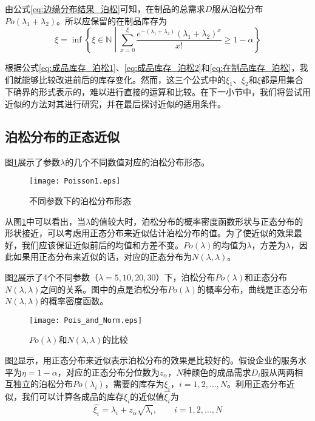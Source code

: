 由公式\ref{eq:边缘分布结果_泊松}可知，在制品的总需求$D$服从泊松分布$Po(\lambda_1+\lambda_2)$。所以应保留的在制品库存为
\begin{equation}
\xi = \inf\left\{\xi\in\mathbb{N}\middle|\sum_{x=0}^{\xi}\frac{e^{-(\lambda_1+\lambda_2)}(\lambda_1+\lambda_2)^x}{x!}\geq 1-\alpha\right\}
\label{eq:在制品库存_泊松}
\end{equation}

根据公式\ref{eq:成品库存_泊松1}、\ref{eq:成品库存_泊松2}和\ref{eq:在制品库存_泊松}，我们就能够比较改进前后的库存变化。然而，这三个公式中的$\xi_1$、$\xi_2$和$\xi$都是用集合下确界的形式表示的，难以进行直接的运算和比较。在下一小节中，我们将尝试用近似的方法对其进行研究，并在最后探讨近似的适用条件。




\subsection{泊松分布的正态近似}

图\ref{fig:泊松分布形态}展示了参数$\lambda$的几个不同数值对应的泊松分布形态。

\begin{figure}[htbp]
\centering
\texttt{[image: Poisson1.eps]}
\caption{不同参数下的泊松分布形态}
\label{fig:泊松分布形态}
\end{figure}

从图\ref{fig:泊松分布形态}中可以看出，当$\lambda$的值较大时，泊松分布的概率密度函数形状与正态分布的形状接近，可以考虑用正态分布来近似估计泊松分布的值。为了使近似的效果最好，我们应该保证近似前后的均值和方差不变。$Po(\lambda)$的均值为$\lambda$，方差为$\lambda$，因此如果用正态分布来近似的话，对应的正态分布为$N(\lambda,\lambda)$。

图\ref{fig:泊松分布和正态分布的比较}展示了4个不同参数（$\lambda=5,10,20,30$）下，泊松分布$Po(\lambda)$和正态分布$N(\lambda,\lambda)$之间的关系。图中的点是泊松分布$Po(\lambda)$的概率分布，曲线是正态分布$N(\lambda,\lambda)$的概率密度函数。

\begin{figure}[htb]
\centering
\texttt{[image: Pois\_and\_Norm.eps]}
\caption{$Po(\lambda)$和$N(\lambda,\lambda)$的比较}
\label{fig:泊松分布和正态分布的比较}
\end{figure}

图\ref{fig:泊松分布和正态分布的比较}显示，用正态分布来近似表示泊松分布的效果是比较好的。假设企业的服务水平为$\eta=1-\alpha$，对应的正态分布分位数为$z_\alpha$，$N$种颜色的成品需求$D_i$服从两两相互独立的泊松分布$Po(\lambda_i)$，需要的库存为$\xi_i$，$i=1,2,\ldots,N$。利用正态分布近似，我们可以计算各成品的库存$\xi_i$的近似值$\hat{\xi_i}$为
\begin{equation}
\hat{\xi_i} = \lambda_i + z_\alpha\sqrt{\lambda_i},\qquad i=1,2,\ldots,N
\label{eq:正态近似下的成品库存}
\end{equation}

